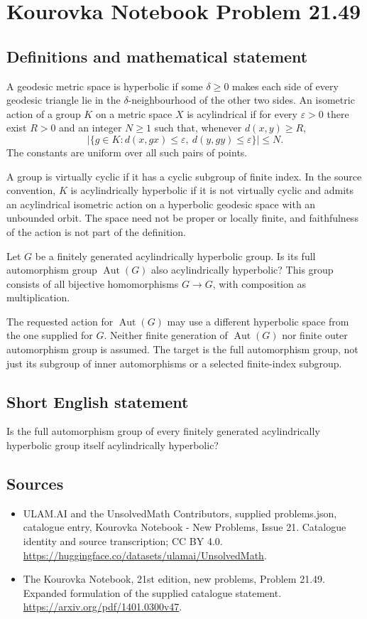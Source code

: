 \documentclass[11pt,a4paper]{article}
\begin{document}
\section*{Kourovka Notebook Problem 21.49}\label{statement}

\subsection{Definitions and mathematical statement}
A geodesic metric space is hyperbolic if some $\delta\ge0$ makes each
side of every geodesic triangle lie in the $\delta$-neighbourhood of the
other two sides. An isometric action of a group $K$ on a metric space
$X$ is acylindrical if for every $\varepsilon>0$ there exist $R>0$ and
an integer $N\ge1$ such that, whenever $d(x,y)\ge R$,
\[
 |\{g\in K:d(x,gx)\le\varepsilon,
                  \ d(y,gy)\le\varepsilon\}|\le N.
\]
The constants are uniform over all such pairs of points.

A group is virtually cyclic if it has a cyclic subgroup of finite
index. In the source convention, $K$ is acylindrically hyperbolic if
it is not virtually cyclic and admits an acylindrical isometric action
on a hyperbolic geodesic space with an unbounded orbit.
The space need not be proper or locally finite, and faithfulness of
the action is not part of the definition.

Let $G$ be a finitely generated acylindrically hyperbolic group. Is its
full automorphism group $\operatorname{Aut}(G)$ also acylindrically
hyperbolic? This group consists of all bijective homomorphisms $G\to G$,
with composition as multiplication.

The requested action for $\operatorname{Aut}(G)$ may use a different
hyperbolic space from the one supplied for $G$. Neither finite generation
of $\operatorname{Aut}(G)$ nor finite outer automorphism group is assumed.
The target is the full automorphism group, not just its subgroup of
inner automorphisms or a selected finite-index subgroup.
\subsection{Short English statement}
Is the full automorphism group of every finitely generated acylindrically hyperbolic group itself acylindrically hyperbolic?
\subsection{Sources}
\begin{itemize}
\item[S1] ULAM.AI and the UnsolvedMath Contributors, supplied problems.json, catalogue entry, Kourovka Notebook - New Problems, Issue 21. Catalogue identity and source transcription; CC BY 4.0.
\url{https://huggingface.co/datasets/ulamai/UnsolvedMath}.
\item[S2] The Kourovka Notebook, 21st edition, new problems, Problem 21.49. Expanded formulation of the supplied catalogue statement.
\url{https://arxiv.org/pdf/1401.0300v47}.
\end{itemize}
\end{document}
